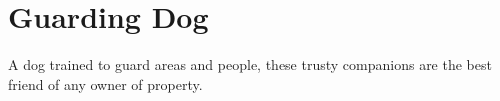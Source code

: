 \section{Guarding Dog}

A dog trained to guard areas and people, these trusty companions are the best friend of any owner of property.